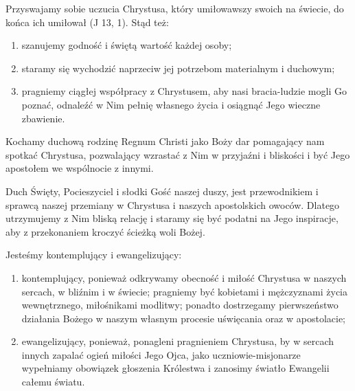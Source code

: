  
 Przyswajamy sobie uczucia Chrystusa, który umiłowawszy swoich na świecie, do końca ich umiłował (J 13, 1). Stąd też:


\begin{enumerate}


\item szanujemy godność i świętą wartość każdej osoby;


\item staramy się wychodzić naprzeciw jej potrzebom materialnym i duchowym;


\item pragniemy ciągłej współpracy z Chrystusem, aby nasi bracia-ludzie mogli Go poznać, odnaleźć w Nim pełnię własnego życia i osiągnąć Jego wieczne zbawienie.


\end{enumerate}


\filbreak
{}
 
 Kochamy duchową rodzinę Regnum Christi jako Boży dar pomagający nam spotkać Chrystusa, pozwalający wzrastać z Nim w przyjaźni i bliskości i być Jego apostołem we wspólnocie z innymi.
 
 
 Duch Święty, Pocieszyciel i słodki Gość naszej duszy, jest przewodnikiem i sprawcą naszej przemiany w Chrystusa i naszych apostolskich owoców. Dlatego utrzymujemy z Nim bliską relację i staramy się być podatni na Jego inspiracje, aby z przekonaniem kroczyć ścieżką woli Bożej.
 
 
 Jesteśmy kontemplujący i ewangelizujący:


\begin{enumerate}


\item kontemplujący, ponieważ odkrywamy obecność i miłość Chrystusa w naszych sercach, w bliźnim i w świecie; pragniemy być kobietami i mężczyznami życia wewnętrznego, miłośnikami modlitwy; ponadto dostrzegamy pierwszeństwo działania Bożego w naszym własnym procesie uświęcania oraz w apostolacie;


\item ewangelizujący, ponieważ, ponagleni pragnieniem Chrystusa, by w sercach innych zapalać ogień miłości Jego Ojca, jako uczniowie-misjonarze wypełniamy obowiązek głoszenia Królestwa i zanosimy światło Ewangelii całemu światu.


\end{enumerate}


